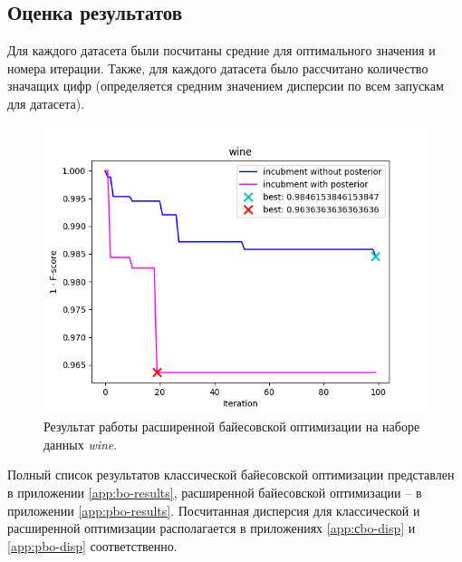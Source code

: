 \documentclass[times,specification,annotation]{itmo-student-thesis}
\begin{document}
	\subsection{Оценка результатов}
	Для каждого датасета были посчитаны средние для оптимального значения и номера итерации. Также, для каждого датасета было рассчитано количество значащих цифр (определяется средним значением дисперсии по всем запускам для датасета). \par
	\begin{figure}[!ht]
		\caption{Результат работы расширенной байесовской оптимизации на наборе данных \textit{wine}.}\label{img:pbo-wine}
		\includegraphics[width=0.85\linewidth]{../png/incubment-iteration-posterior/wine}
		\centering
	\end{figure}
	Полный список результатов классической байесовской оптимизации представлен в приложении  \ref{app:bo-results}, расширенной байесовской оптимизации -- в приложении \ref{app:pbo-results}. Посчитанная дисперсия для классической и расширенной оптимизации располагается в приложениях \ref{app:сbo-disp} и \ref{app:pbo-disp} соответственно.
	
\end{document}
